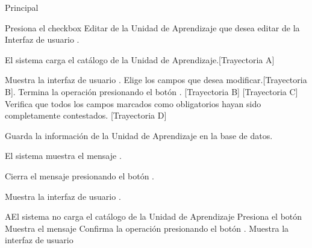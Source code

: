 \begin{UCtrayectoria}{Principal}

    \UCpaso[\UCactor] Presiona el checkbox Editar de la Unidad de Aprendizaje que desea editar de la Interfaz de usuario  .

    \UCpaso El sistema carga el catálogo de la Unidad de Aprendizaje.[Trayectoria A]


    \UCpaso Muestra la interfaz de usuario .
    \UCpaso[\UCactor] Elige los campos que desea modificar.[Trayectoria B].
    \UCpaso[\UCactor] Termina la operación presionando el botón . [Trayectoria B] [Trayectoria C]
    \UCpaso Verifica que todos los campos marcados como obligatorios hayan sido completamente contestados. [Trayectoria D]

    \UCpaso Guarda la información de la Unidad de Aprendizaje en la base de datos.

    \UCpaso El sistema muestra el mensaje .

    \UCpaso[\UCactor] Cierra el mensaje presionando el botón .

    \UCpaso Muestra la interfaz de usuario .
\end{UCtrayectoria}


\begin{comment}
\begin{UCtrayectoriaA}{A}{El sistema no encuentra ningún formulario para mostrar.}
	\UCpaso No encuentra ningún formulario para mostrar.
    \UCpaso El sistema muestra el mensaje \MSGref{MSG6}{Por el momento no se puede registrar la bibliografía}.
    \UCpaso[\UCactor] Cierra el mensaje presionando el botón \IUbutton{Aceptar}.
    \UCpaso Continua en el paso 1 de la trayectoria principal del \UCref{CU1}.
\end{UCtrayectoriaA}
\end{comment}


\begin{UCtrayectoriaA}{A}{El sistema no carga el catálogo de la Unidad de Aprendizaje}
	\UCpaso[\UCactor] Presiona el botón 
	\UCpaso Muestra el mensaje 
	\UCpaso[\UCactor] Confirma la operación presionando el botón .
	 \UCpaso Muestra la interfaz de usuario 

\end{UCtrayectoriaA}

